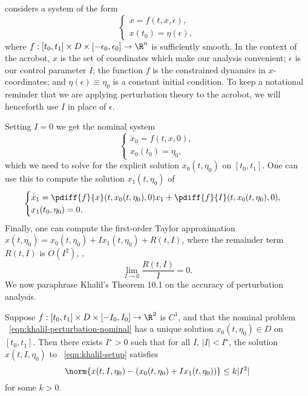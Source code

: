 \citet{khalil_nonlinear} considers a system of the form
\begin{equation}\label{eqn:khalil-setup}
    \begin{cases}
        \dot{x} = f(t,x,\epsilon), \\
        x(t_0) = \eta(\epsilon),
    \end{cases}
\end{equation}
where 
\(f : [t_0,t_1] \times D \times [-\epsilon_0,\epsilon_0] \rightarrow \R^n\) is
sufficiently smooth.
In the context of the acrobot, \(x\) is the set of coordinates which make
our analysis convenient;
\(\epsilon\) is our control parameter \(I\);
the function \(f\) is the constrained dynamics in \(x\)-coordinates;
and \(\eta(\epsilon) \equiv \eta_0\) is a constant initial condition.
To keep a notational reminder that we are applying perturbation theory to
the acrobot, we will henceforth use \(I\) in place of \(\epsilon\).

Setting \(I = 0\) we get the nominal system
\begin{equation}\label{eqn:khalil-perturbation-nominal}
    \begin{cases}
        \dot{x}_0 = f(t,x,0) ,\\
        x_0(t_0) = \eta_0 ,
    \end{cases}
\end{equation}
which we need to solve for the explicit solution \(x_0(t,\eta_0)\) on \([t_0,t_1]\).
One can use this to compute the solution \(x_1(t,\eta_0)\) of
\begin{equation}\label{eqn:khalil-perturbation-firstorder}
    \begin{cases}
        \dot{x}_1 = \pdiff{f}{x}(t,x_0(t,\eta_0),0)x_1 + \pdiff{f}{I}(t,x_0(t,\eta_0),0)
        , \\
        x_1(t_0,\eta_0) = 0
        .
    \end{cases}
\end{equation}
Finally, one can compute the first-order Taylor approximation
\(x(t,\eta_0) = x_0(t,\eta_0) + I x_1(t,\eta_0) + R(t,I)\), where the remainder
term \(R(t,I)\) is \(O(I^2)\), \ie,
\[
    \lim \limits_{I \to 0} \frac{R(t,I)}{I} = 0
    .
\]
We now paraphrase Khalil's Theorem 10.1 \cite{khalil_nonlinear} on the
accuracy of perturbation analysis.
\begin{thm}\label{thm:khalil-perturbation}
    Suppose \(f : [t_0,t_1] \times D \times [-I_0,I_0] \rightarrow \R^2\) is
    \(C^1\), and that the nominal problem ~\eqref{eqn:khalil-perturbation-nominal} has a
    unique solution \(x_0(t,\eta_0) \in D\) on \([t_0,t_1]\).
    Then there exists \(I^\star > 0\) such that for all \(I,\, |I| < I^\star\), the
    solution \(x(t,I,\eta_0)\) to ~\eqref{eqn:khalil-setup} satisfies
    \[
        \norm{x(t,I,\eta_0) - \left(x_0(t,\eta_0) + I x_1(t,\eta_0)\right)} \leq k |I^2|
    \]
    for some \(k > 0\).
\end{thm}

